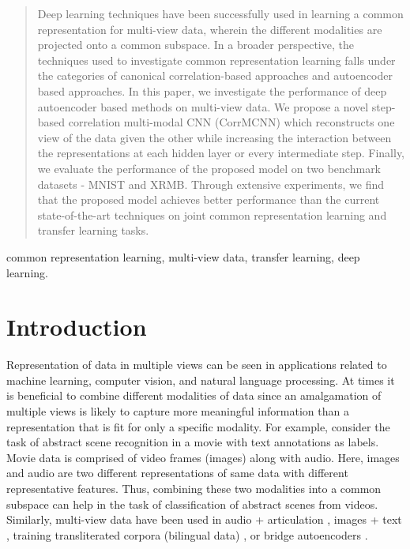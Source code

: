 \documentclass[10pt, a4paper, conference, compsocconf]{IEEEtran}
\begin{document}
\begin{abstract}
Deep learning techniques have been successfully used in learning a common representation for multi-view data, wherein the different modalities are projected onto a common subspace. In a broader perspective, the techniques used to investigate common representation learning falls under the categories of canonical correlation-based approaches and autoencoder based approaches. In this paper, we investigate the performance of deep autoencoder based methods on multi-view data. We propose a novel step-based correlation multi-modal CNN (CorrMCNN) which reconstructs one view of the data given the other while increasing the interaction between the representations at each hidden layer or every intermediate step. Finally, we evaluate the performance of the proposed model on two benchmark datasets - MNIST and XRMB. Through extensive experiments, we find that the proposed model achieves better performance than the current state-of-the-art techniques on joint common representation learning and transfer learning tasks.
\end{abstract}

\begin{IEEEkeywords}
common representation learning, multi-view data, transfer learning, deep learning.
\end{IEEEkeywords}


%
\IEEEpeerreviewmaketitle
\section{Introduction}


Representation of data in multiple views can be seen in applications related to machine learning, computer vision, and natural language processing. At times it is beneficial to combine different modalities of data since an amalgamation of multiple views is likely to capture more meaningful information than a representation that is fit for only a specific modality. For example, consider the task of abstract scene recognition in a movie \cite{rasheed2003scene} with text annotations as labels. Movie data is comprised of video frames (images) along with audio. Here, images and audio are two different representations of same data with different representative features. Thus, combining these two modalities into a common subspace can help in the task of classification of abstract scenes from videos. Similarly, multi-view data have been used in audio + articulation \cite{arora2012kernel,wang2015unsupervised}, images + text \cite{vinyals2017show,you2016image}, training transliterated corpora (bilingual data) \cite{hermann2014multilingual,klementiev2012inducing,hermann2013multilingual,chandar2016correlational}, or bridge autoencoders \cite{saha2016correlational}.
\end{document}
